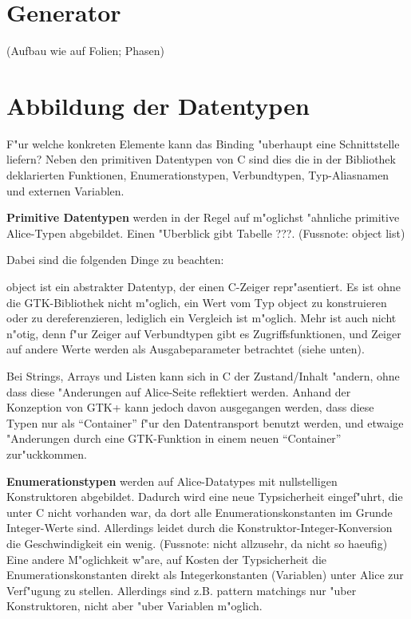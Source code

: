 \documentclass{article}
\begin{document}
\section{Generator}

(Aufbau wie auf Folien; Phasen)

\section{Abbildung der Datentypen}

F"ur welche konkreten Elemente kann das Binding "uberhaupt eine Schnittstelle
liefern? Neben den primitiven Datentypen von C sind dies die in der Bibliothek
deklarierten Funktionen, Enumerationstypen, Verbundtypen, Typ-Aliasnamen
und externen Variablen.

\textbf{Primitive Datentypen} werden in der Regel auf m"oglichst
"ahnliche primitive Alice-Typen abgebildet. Einen "Uberblick gibt Tabelle ???.
(Fussnote: object list)

Dabei sind die folgenden Dinge zu beachten:

object ist ein abstrakter Datentyp, der einen C-Zeiger repr"asentiert.
Es ist ohne die GTK-Bibliothek nicht m"oglich, ein Wert vom Typ object zu
konstruieren oder zu dereferenzieren, lediglich ein Vergleich ist m"oglich.
Mehr ist auch nicht n"otig, denn f"ur Zeiger auf Verbundtypen gibt es
Zugriffsfunktionen, und Zeiger auf andere Werte werden als Ausgabeparameter
betrachtet (siehe unten).

Bei Strings, Arrays und Listen kann sich in C der Zustand/Inhalt "andern,
ohne dass diese "Anderungen auf Alice-Seite reflektiert werden. Anhand der
Konzeption von GTK+ kann jedoch davon ausgegangen werden, dass diese Typen
nur als ``Container'' f"ur den Datentransport benutzt werden, und etwaige
"Anderungen durch eine GTK-Funktion in einem neuen ``Container'' zur"uckkommen.

\textbf{Enumerationstypen} werden auf Alice-Datatypes mit nullstelligen
Konstruktoren abgebildet. Dadurch wird eine neue Typsicherheit eingef"uhrt,
die unter C nicht vorhanden war, da dort alle Enumerationskonstanten im Grunde
Integer-Werte sind. Allerdings leidet durch die Konstruktor-Integer-Konversion
die Geschwindigkeit ein wenig. 
(Fussnote: nicht allzusehr, da nicht so haeufig)
Eine andere M"oglichkeit w"are, auf Kosten der Typsicherheit 
die Enumerationskonstanten direkt als Integerkonstanten (Variablen) unter Alice
zur Verf"ugung zu stellen. Allerdings sind z.B. pattern matchings nur "uber
Konstruktoren, nicht aber "uber Variablen m"oglich.
\end{document}
